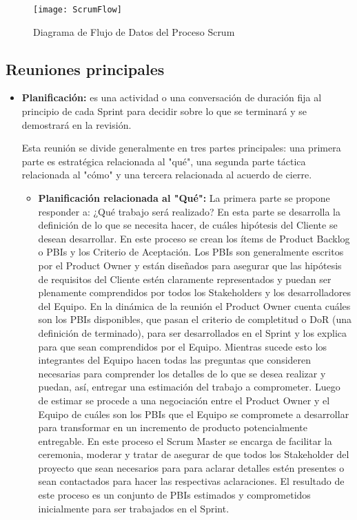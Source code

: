 \begin{figure}[h]
  \centering
  \texttt{[image: ScrumFlow]}
  \caption{Diagrama de Flujo de Datos del Proceso Scrum}
  \centering
  \label{fig:ScrumFlow} %
\end{figure}

\subsection{Reuniones principales}

\begin{itemize}

\item \textbf{Planificación:} es una actividad o una conversación de duración fija al principio de cada Sprint para decidir sobre lo que se terminará y se demostrará en la revisión.

Esta reunión se divide generalmente en tres partes principales: una primera parte es estratégica relacionada al "qué", una segunda parte táctica relacionada al "cómo" y una tercera relacionada al acuerdo de cierre. 

\begin{itemize}

\item \textbf{Planificación relacionada al "Qué":} La primera parte se propone responder a: ¿Qué trabajo será realizado? En esta parte se desarrolla la definición de lo que se necesita hacer, de cuáles hipótesis del Cliente se desean desarrollar. En este proceso se crean los ítems de Product Backlog o PBIs y los Criterio de Aceptación. Los PBIs son generalmente escritos por el Product Owner y están diseñados para asegurar que las hipótesis de requisitos del Cliente estén claramente representados y puedan ser plenamente comprendidos por todos los Stakeholders y los desarrolladores del Equipo.
En la dinámica de la reunión el Product Owner cuenta cuáles son los PBIs disponibles, que pasan el criterio de completitud o DoR (una definición de terminado), para ser desarrollados en el Sprint y los explica para que sean comprendidos por el Equipo. Mientras sucede esto los integrantes del Equipo hacen todas las preguntas que consideren necesarias para comprender los detalles de lo que se desea realizar y puedan, así, entregar una estimación del trabajo a comprometer. Luego de estimar se procede a una negociación entre el Product Owner y el Equipo de cuáles son los PBIs que el Equipo se compromete a desarrollar para transformar en un incremento de producto potencialmente entregable. En este proceso el Scrum Master se encarga de facilitar la ceremonia, moderar y tratar de asegurar de que todos los Stakeholder del proyecto que sean necesarios para para aclarar detalles estén presentes o sean contactados para hacer las respectivas aclaraciones.
El resultado de este proceso es un conjunto de PBIs estimados y comprometidos inicialmente para ser trabajados en el Sprint.


\end{itemize}
\end{itemize}
